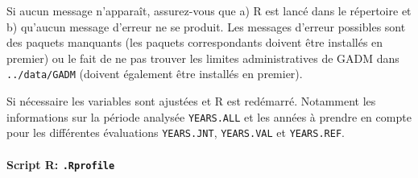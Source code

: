 \documentclass[a4paper, notitlepage, 12pt, krantz2]{krantz}
\let\oldparagraph\paragraph
\renewcommand{\paragraph}[1]{\oldparagraph{#1}\mbox{}}
\begin{document}
Si aucun message n'apparaît, assurez-vous que a) R est lancé dans le répertoire et b) qu'aucun message d'erreur ne se produit. Les messages d'erreur possibles sont des paquets manquants (les paquets correspondants doivent être installés en premier) ou le fait de ne pas trouver les limites administratives de GADM dans \texttt{../data/GADM} (doivent également être installés en premier).

Si nécessaire les variables sont ajustées et R est redémarré. Notamment les informations sur la période analysée \texttt{YEARS.ALL} et les années à prendre en compte pour les différentes évaluations \texttt{YEARS.JNT}, \texttt{YEARS.VAL} et \texttt{YEARS.REF}.

\hypertarget{script-r-.rprofile}{%
\paragraph{\texorpdfstring{Script R: \texttt{.Rprofile}}{Script R: .Rprofile}}\label{script-r-.rprofile}}
\end{document}
